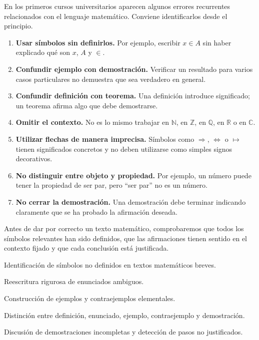 En los primeros cursos universitarios aparecen algunos errores recurrentes relacionados con el lenguaje matemático. Conviene identificarlos desde el principio.

\begin{enumerate}
  \item \textbf{Usar símbolos sin definirlos.} Por ejemplo, escribir \(x\in A\) sin haber explicado qué son \(x\), \(A\) y \(\in\).

  \item \textbf{Confundir ejemplo con demostración.} Verificar un resultado para varios casos particulares no demuestra que sea verdadero en general.

  \item \textbf{Confundir definición con teorema.} Una definición introduce significado; un teorema afirma algo que debe demostrarse.

  \item \textbf{Omitir el contexto.} No es lo mismo trabajar en \(\mathbb{N}\), en \(\mathbb{Z}\), en \(\mathbb{Q}\), en \(\mathbb{R}\) o en \(\mathbb{C}\).

  \item \textbf{Utilizar flechas de manera imprecisa.} Símbolos como \(\Rightarrow\), \(\Leftrightarrow\) o \(\mapsto\) tienen significados concretos y no deben utilizarse como simples signos decorativos.

  \item \textbf{No distinguir entre objeto y propiedad.} Por ejemplo, un número puede tener la propiedad de ser par, pero ``ser par'' no es un número.

  \item \textbf{No cerrar la demostración.} Una demostración debe terminar indicando claramente que se ha probado la afirmación deseada.
\end{enumerate}

\begin{convencion}
Antes de dar por correcto un texto matemático, comprobaremos que todos los símbolos relevantes han sido definidos, que las afirmaciones tienen sentido en el contexto fijado y que cada conclusión está justificada.
\end{convencion}

\begin{seminario}
  \item Identificación de símbolos no definidos en textos matemáticos breves.
  \item Reescritura rigurosa de enunciados ambiguos.
  \item Construcción de ejemplos y contraejemplos elementales.
  \item Distinción entre definición, enunciado, ejemplo, contraejemplo y demostración.
  \item Discusión de demostraciones incompletas y detección de pasos no justificados.
\end{seminario}

